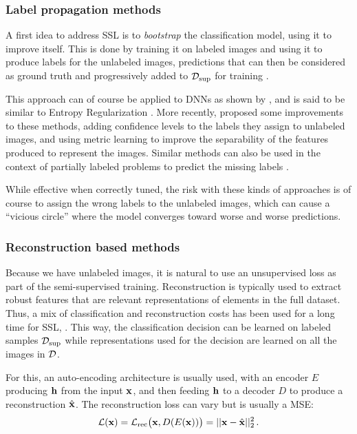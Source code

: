 \subsubsection{Label propagation methods}

A first idea to address \ac{SSL} is to \textit{bootstrap} the classification model, \ie using it to improve itself. This is done by training it on labeled images and using it to produce labels for the unlabeled images, predictions that can then be considered as ground truth and progressively added to $\mathcal{D}_\mathrm{sup}$ for training \citep{blum1998combining,zhu2002learning}.

This approach can of course be applied to \acp{DNN} as shown by \citet{lee2013pseudo}, and is said to be similar to Entropy Regularization \citep{grandvalet2005semi}.
More recently, \citet{shi2018transductive,iscen2019label} proposed some improvements to these methods, adding confidence levels to the labels they assign to unlabeled images, and using metric learning to improve the separability of the features produced to represent the images. Similar methods can also be used in the context of partially labeled problems to predict the missing labels \citep{durand2019learning}.

While effective when correctly tuned, the risk with these kinds of approaches is of course to assign the wrong labels to the unlabeled images, which can cause a ``vicious circle'' where the model converges toward worse and worse predictions.


\subsubsection{Reconstruction based methods} \label{shade:sec:RW_SSL_rec}

Because we have unlabeled images, it is natural to use an unsupervised loss as part of the semi-supervised training. Reconstruction is typically used to extract robust features that are relevant representations of elements in the full dataset. Thus, a mix of classification and reconstruction costs has been used for a long time for \ac{SSL}, \eg \citet{Ranzato2008}. This way, the classification decision can be learned on labeled samples $\mathcal{D}_\mathrm{sup}$ while representations used for the decision are learned on all the images in $\mathcal{D}$.

For this, an auto-encoding architecture is usually used, with an encoder $E$ producing $\mathbf{h}$ from the input $\mathbf{x}$, and then feeding $\mathbf{h}$ to a decoder $D$ to produce a reconstruction $\hat{\mathbf{x}}$. The reconstruction loss can vary but is usually a \ac{MSE}:
\begin{equation}
  \mathcal{L}(\mathbf{x}) = \mathcal{L}_\mathrm{rec} \big(\mathbf{x}, D(E(\mathbf{x}))\big) = ||\mathbf{x} - \hat{\mathbf{x}}||_2^2 \,.
\end{equation}

